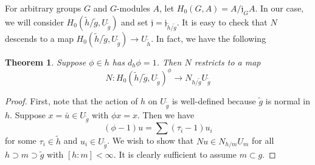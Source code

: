 \documentclass{article}
\newcommand{\f}{\mathfrak}
\newtheorem{theorem}{Theorem}
\begin{document}
For arbitrary groups $G$ and $G$-modules $A$, let $H_0(G,A) = A/\f j_G A$. In 
our case, we will consider $H_0(\tilde h/\tilde g,U_{\tilde g})$ and set 
$\f j = \f j_{\tilde h/\tilde g}$. It is easy to check that $N$ descends to a 
map $H_0(\tilde h/\tilde g,U_{\tilde g}) \to U_{\tilde h}$. In fact, we have 
the following 

\begin{theorem}
Suppose $\phi\in h$ has $d_h \phi = 1$. Then $N$ restricts to a map 
\[
  N : H_0(\tilde h/\tilde g,U_{\tilde g})^\phi \to N_{h/\tilde g} U_{\tilde g}
\]
\end{theorem}
\begin{proof}
First, note that the action of $h$ on $U_{\tilde g}$ is well-defined because 
$\tilde g$ is normal in $h$. Suppose $x = \bar u\in U_{\tilde g}$ with 
$\phi x = x$. Then we have 
\[
  (\phi-1) u = \sum (\tau_i - 1) u_i
\]
for some $\tau_i\in \tilde h$ and $u_i\in U_{\tilde g}$. We wish to show that 
$N u\in N_{h/m} U_m$ for all $h\supset m\supset \tilde g$ with $[h:m]<\infty$. 
It is clearly sufficient to assume $m\subset g$. 
\end{proof}
\end{document}
